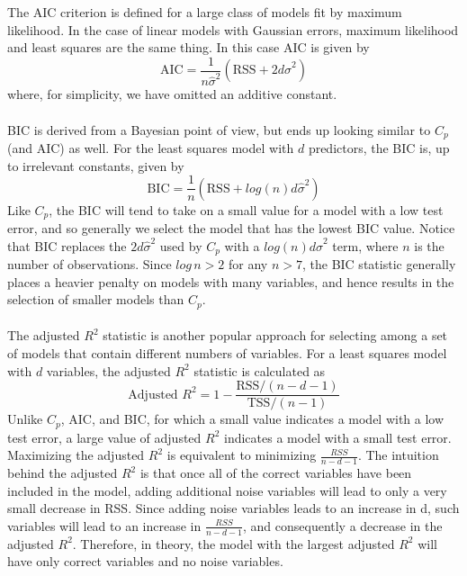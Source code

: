 The AIC criterion is defined for a large class of models fit by maximum
likelihood. In the case of linear models with Gaussian errors, maximum
likelihood and least squares are the same thing. In this case AIC is given by
\[\text{AIC} = \frac{1}{n\hat{\sigma}^2}(\text{RSS} + 2d \hat{\sigma}^2)\]
where, for simplicity, we have omitted an additive constant.\\\\
BIC is derived from a Bayesian point of view, but ends up looking similar
to $C_p$ (and AIC) as well. For the least squares model with $d$ predictors, the BIC is, up to irrelevant constants, given by
\[\text{BIC} = \frac{1}{n} (\text{RSS} + log(n)d\hat{\sigma}^2)\]
Like $C_p$, the BIC will tend to take on a small value for a model with a
low test error, and so generally we select the model that has the lowest
BIC value. Notice that BIC replaces the $2d \hat{\sigma}^2$ used by $C_p$ with a $log(n)d\hat{\sigma}^2$ term, where $n$ is the number of observations. Since $log\, n > 2$ for any $n > 7$, the BIC statistic generally places a heavier penalty on models with many variables, and hence results in the selection of smaller models than $C_p$.\\\\
The adjusted $R^2$ statistic is another popular approach for selecting among
a set of models that contain different numbers of variables. For a least squares model with $d$ variables, the adjusted $R^2$ statistic is calculated as
\[\text{Adjusted } R^2 = 1 - \frac{\text{RSS} / (n - d - 1)}{\text{TSS}/(n-1)}\]
Unlike $C_p$, AIC, and BIC, for which a small value indicates a model with
a low test error, a large value of adjusted $R^2$ indicates a model with a
small test error. Maximizing the adjusted $R^2$ is equivalent to minimizing
$\frac{RSS}{n - d - 1}$. The intuition behind the adjusted $R^2$ is that once all of the correct variables have been included in the model, adding additional noise variables will lead to only a very small decrease in RSS. Since adding noise variables leads to an increase in d, such variables will lead to an increase in $\frac{RSS}{n - d - 1}$, and consequently a decrease in the adjusted $R^2$. Therefore, in theory, the model with the largest adjusted $R^2$ will have only correct variables and no noise variables.
